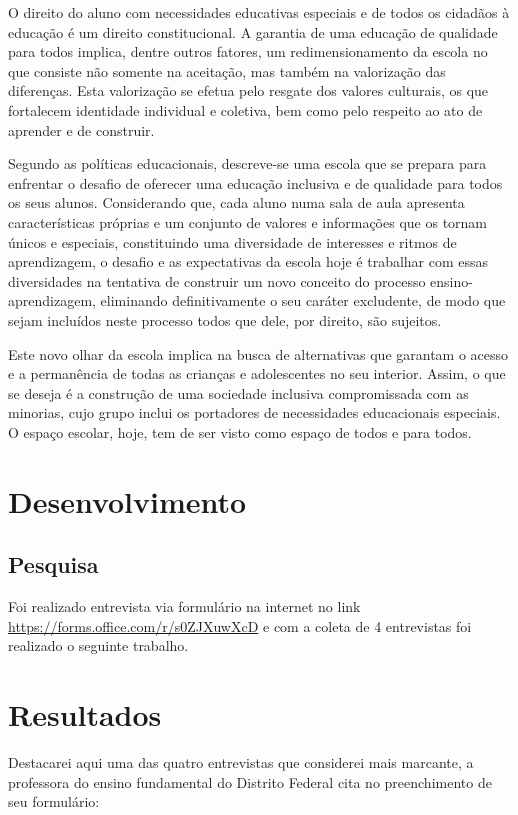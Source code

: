 \documentclass[
	12pt,				%
	openright,			%
	oneside,
	a4paper,			%
	chapter=TITLE,		%
	section=TITLE,		%
	sumario=abnt-6027-2012,
	english,			%
	brazil				%
]{abntex2}
\begin{document}
	O direito do aluno com necessidades educativas especiais e de todos os cidadãos à educação é um direito constitucional. A garantia de uma educação de qualidade para todos implica, dentre outros fatores, um redimensionamento da escola no que consiste não somente na aceitação, mas também na valorização das diferenças. Esta valorização se efetua pelo resgate dos valores culturais, os que fortalecem identidade individual e coletiva, bem como pelo respeito ao ato de aprender e de construir.
	
	Segundo as políticas educacionais, descreve-se uma escola que se prepara para enfrentar o desafio de oferecer uma educação inclusiva e de qualidade para todos os seus alunos. Considerando que, cada aluno numa sala de aula apresenta características próprias e um conjunto de valores e informações que os tornam únicos e especiais, constituindo uma diversidade de interesses e ritmos de aprendizagem, o desafio e as expectativas da escola hoje é trabalhar com essas diversidades na tentativa de construir um novo conceito do processo ensino-aprendizagem, eliminando definitivamente o seu caráter excludente, de modo que sejam incluídos neste processo todos que dele, por direito, são sujeitos.
	
	Este novo olhar da escola implica na busca de alternativas que garantam o acesso e a permanência de todas as crianças e adolescentes no seu interior. Assim, o que se deseja é a construção de uma sociedade inclusiva compromissada com as minorias, cujo grupo inclui os portadores de necessidades educacionais especiais. O espaço escolar, hoje, tem de ser visto como espaço de todos e para todos.

			
\chapter{Desenvolvimento}

	\section{Pesquisa} 

		Foi realizado entrevista via formulário na internet no link \url{https://forms.office.com/r/s0ZJXuwXcD} e com a coleta de 4 entrevistas foi realizado o seguinte trabalho.

\chapter{Resultados}

	Destacarei aqui uma das quatro entrevistas que considerei mais marcante, a professora do ensino fundamental do Distrito Federal cita no preenchimento de seu formulário:
\end{document}
